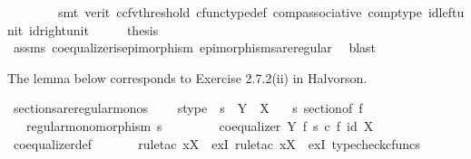 \begin{isabellebody}
\ \ \ \ \ \ \ \ smt\ {\isacharparenleft}{\kern0pt}verit{\isacharcomma}{\kern0pt}\ ccfv{\isacharunderscore}{\kern0pt}threshold{\isacharparenright}{\kern0pt}\ cfunc{\isacharunderscore}{\kern0pt}type{\isacharunderscore}{\kern0pt}def\ comp{\isacharunderscore}{\kern0pt}associative\ comp{\isacharunderscore}{\kern0pt}type\ id{\isacharunderscore}{\kern0pt}left{\isacharunderscore}{\kern0pt}unit{}\ id{\isacharunderscore}{\kern0pt}right{\isacharunderscore}{\kern0pt}unit{}{\isacharparenright}{\kern0pt}\isanewline
\ \ \isamarkupfalse%
\ \isamarkupfalse%
\ {\isacharquery}{\kern0pt}thesis\isanewline
\ \ \ \ \isamarkupfalse%
\ assms\ coequalizer{\isacharunderscore}{\kern0pt}is{\isacharunderscore}{\kern0pt}epimorphism\ epimorphisms{\isacharunderscore}{\kern0pt}are{\isacharunderscore}{\kern0pt}regular\ \isamarkupfalse%
\ blast\isanewline
{}\isamarkupfalse%
%
\endisatagproof
{\isafoldproof}%
%
\isadelimproof
%
\endisadelimproof
%
\begin{isamarkuptext}%
The lemma below corresponds to Exercise 2.7.2(ii) in Halvorson.%
\end{isamarkuptext}\isamarkuptrue%
\isamarkupfalse%
\ sections{\isacharunderscore}{\kern0pt}are{\isacharunderscore}{\kern0pt}regular{\isacharunderscore}{\kern0pt}monos{\isacharcolon}{\kern0pt}\ \isanewline
\ \ \ s{\isacharunderscore}{\kern0pt}type{\isacharcolon}{\kern0pt}\ \ {\isachardoublequoteopen}s\ {\isacharcolon}{\kern0pt}\ Y\ {\isasymrightarrow}\ X{\isachardoublequoteclose}\isanewline
\ \ \ {\isachardoublequoteopen}s\ sectionof\ f{\isachardoublequoteclose}\isanewline
\ \ \ {\isachardoublequoteopen}regular{\isacharunderscore}{\kern0pt}monomorphism\ s{\isachardoublequoteclose}\isanewline
%
\isadelimproof
%
\endisadelimproof
%
\isatagproof
{}\isamarkupfalse%
\ {\isacharminus}{\kern0pt}\ \ \ \isanewline
\ \ \isamarkupfalse%
\ {\isachardoublequoteopen}coequalizer\ Y\ f\ {\isacharparenleft}{\kern0pt}s\ {\isasymcirc}\isactrlsub c\ f{\isacharparenright}{\kern0pt}\ {\isacharparenleft}{\kern0pt}id\ X{\isacharparenright}{\kern0pt}{\isachardoublequoteclose}\isanewline
\ \ \ \ \isamarkupfalse%
\ coequalizer{\isacharunderscore}{\kern0pt}def\ \isanewline
\ \ \ \ \isamarkupfalse%
\ {\isacharparenleft}{\kern0pt}rule{\isacharunderscore}{\kern0pt}tac\ x{\isacharequal}{\kern0pt}{\isachardoublequoteopen}X{\isachardoublequoteclose}\ \ exI{\isacharcomma}{\kern0pt}\ rule{\isacharunderscore}{\kern0pt}tac\ x{\isacharequal}{\kern0pt}{\isachardoublequoteopen}X{\isachardoublequoteclose}\ \ exI{\isacharcomma}{\kern0pt}\ typecheck{\isacharunderscore}{\kern0pt}cfuncs{\isacharcomma}{\kern0pt}\isanewline

\end{isabellebody}
